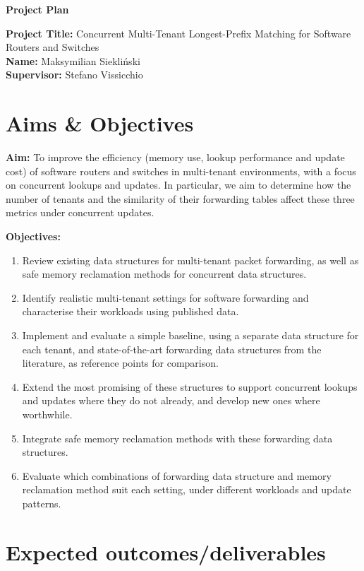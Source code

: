 \documentclass[11pt]{article}
\begin{document}
\begin{center}
  {\Large\textbf{Project Plan}}
\end{center}

\noindent\textbf{Project Title:} Concurrent Multi-Tenant Longest-Prefix Matching for Software Routers and Switches\\
\textbf{Name:} Maksymilian Siekli\'nski\\
\textbf{Supervisor:} Stefano Vissicchio

\section{Aims \& Objectives}

\noindent\textbf{Aim:} To improve the efficiency (memory use, lookup performance and update cost) of
software routers and switches in multi-tenant environments, with a focus on concurrent lookups and
updates. In particular, we aim to determine how the number of tenants and the similarity of their
forwarding tables affect these three metrics under concurrent updates.

\medskip
\noindent\textbf{Objectives:}
\begin{enumerate}
  \item Review existing data structures for multi-tenant packet forwarding, as well as safe memory
  reclamation methods for concurrent data structures.
  \item Identify realistic multi-tenant settings for software forwarding and characterise their
  workloads using published data.
  \item Implement and evaluate a simple baseline, using a separate data structure for each tenant,
  and state-of-the-art forwarding data structures from the literature, as reference points for
  comparison.
  \item Extend the most promising of these structures to support concurrent lookups and updates
  where they do not already, and develop new ones where worthwhile.
  \item Integrate safe memory reclamation methods with these forwarding data structures.
  \item Evaluate which combinations of forwarding data structure and memory reclamation method suit
  each setting, under different workloads and update patterns.
\end{enumerate}

\section{Expected outcomes/deliverables}
\end{document}
